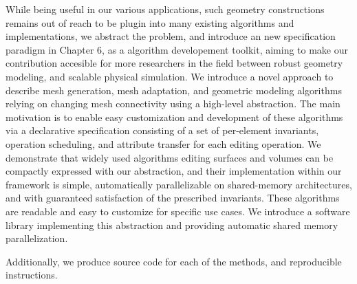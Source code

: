 While being useful in our various applications, such geometry constructions remains out of reach to be plugin into many existing algorithms and implementations, we abstract the problem, and introduce an new specification paradigm in Chapter 6, as a algorithm developement toolkit, aiming to make our contribution accesible for more researchers in the field between robust geometry modeling, and scalable physical simulation.
We introduce a novel approach to describe mesh generation, mesh adaptation, and geometric modeling algorithms relying on changing mesh connectivity using a high-level abstraction. The main motivation is to enable easy customization and development of these algorithms via a declarative specification consisting of a set of per-element invariants, operation scheduling, and attribute transfer for each editing operation.
We demonstrate that widely used algorithms editing surfaces and volumes can be compactly expressed with our abstraction, and their implementation within our framework is simple, automatically parallelizable on shared-memory architectures, and with guaranteed satisfaction of the prescribed invariants. These algorithms are readable and easy to customize for specific use cases.
We introduce a software library implementing this abstraction and providing automatic shared memory parallelization.

Additionally, we produce source code for each of the methods, and reproducible instructions.
